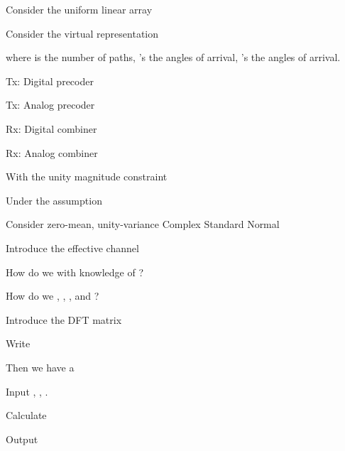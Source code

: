 {
\I Consider the uniform linear array

\I Consider the virtual representation

\I where  is the number of paths, 's the angles of arrival, 's the angles of arrival.
}
{
\I Tx: Digital precoder 

\I Tx: Analog precoder 

\I Rx: Digital combiner 

\I Rx: Analog combiner 

\I With the unity magnitude constraint

\I Under the assumption
}
{
\I Consider zero-mean, unity-variance Complex Standard Normal 

\I Introduce the effective channel

\I How do we   with knowledge of ?

\I How do we  , , , and ?
}
{
\I Introduce the DFT matrix 

\I Write

\I Then we have a 
}
{
\I Input , , .

\I Calculate

\I Output 
}

